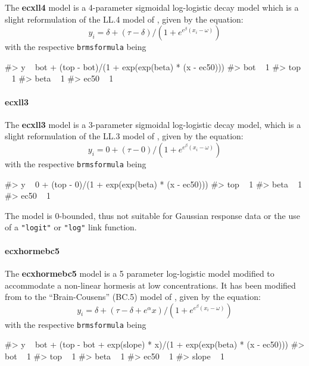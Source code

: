 The \textbf{ecxll4} model is a 4-parameter sigmoidal log-logistic decay
model which is a slight reformulation of the LL.4 model of
\citet{Ritz2016}, given by the equation:
\[y_i = \delta + (\tau - \delta)/ (1 + e^{e^{\beta} (x_i - \omega)})\]
with the respective \texttt{brmsformula} being

\begin{Schunk}
\begin{Soutput}
#> y ~ bot + (top - bot)/(1 + exp(exp(beta) * (x - ec50))) 
#> bot ~ 1
#> top ~ 1
#> beta ~ 1
#> ec50 ~ 1
\end{Soutput}
\end{Schunk}

\hypertarget{ecxll3}{%
\paragraph{ecxll3}\label{ecxll3}}

The \textbf{ecxll3} model is a 3-parameter sigmoidal log-logistic decay
model, which is a slight reformulation of the LL.3 model of
\citet{Ritz2016}, given by the equation:
\[y_i = 0 + (\tau - 0)/ (1 + e^{e^{\beta} (x_i - \omega)})\] with the
respective \texttt{brmsformula} being

\begin{Schunk}
\begin{Soutput}
#> y ~ 0 + (top - 0)/(1 + exp(exp(beta) * (x - ec50))) 
#> top ~ 1
#> beta ~ 1
#> ec50 ~ 1
\end{Soutput}
\end{Schunk}

The model is 0-bounded, thus not suitable for Gaussian response data or
the use of a \texttt{"logit"} or \texttt{"log"} link function.

\hypertarget{ecxhormebc5}{%
\paragraph{ecxhormebc5}\label{ecxhormebc5}}

The \textbf{ecxhormebc5} model is a 5 parameter log-logistic model
modified to accommodate a non-linear hormesis at low concentrations. It
has been modified from to the ``Brain-Cousens'' (BC.5) model of
\citet{Ritz2016}, given by the equation:
\[y_i = \delta + (\tau - \delta + e^{\alpha} x)/ (1 + e^{e^{\beta} (x_i - \omega)})\]
with the respective \texttt{brmsformula} being

\begin{Schunk}
\begin{Soutput}
#> y ~ bot + (top - bot + exp(slope) * x)/(1 + exp(exp(beta) * (x - ec50))) 
#> bot ~ 1
#> top ~ 1
#> beta ~ 1
#> ec50 ~ 1
#> slope ~ 1
\end{Soutput}
\end{Schunk}

